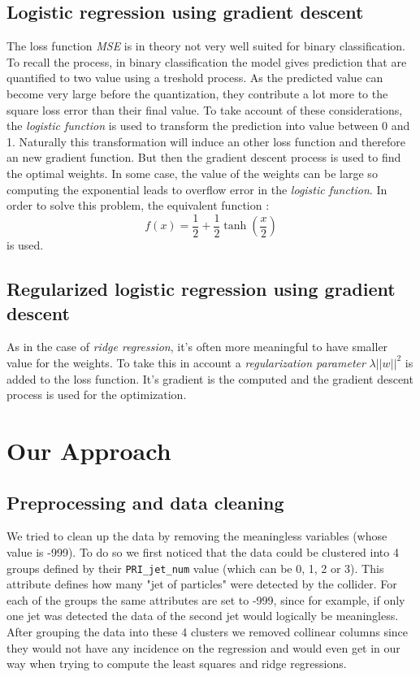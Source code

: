\documentclass[10pt,conference,compsocconf]{IEEEtran}
\begin{document}
\subsection{Logistic regression using gradient descent}
The loss function \textit{MSE} is in theory not very well suited for binary classification. To recall the process, in binary classification the model gives prediction that are quantified to two value using a treshold process. As the predicted value can become very large before the quantization, they contribute a lot more to the square loss error than their final value. To take account of these considerations, the \textit{logistic function} is used to transform the prediction into value between 0 and 1. Naturally this transformation will induce an other loss function and therefore an new gradient function. But then the gradient descent process is used to find the optimal weights. In some case, the value of the weights can be large so computing the exponential leads to overflow error in the \textit{logistic function}. In order to solve this problem, the equivalent function : 
\begin{equation}
f(x) = \frac{1}{2}+\frac{1}{2}\tanh \left(\frac{x}{2}\right)
\end{equation} 
is used.
\subsection{Regularized logistic regression using gradient descent}

As in the case of \textit{ridge regression}, it's often more meaningful to have smaller value for the weights. To take this in account a \textit{regularization parameter} $\lambda \vert\vert w \vert\vert ^2$ is added to the loss function. It's gradient is the computed and the gradient descent process is used for the optimization.


\section{Our Approach}

\subsection{Preprocessing and data cleaning}
We tried to clean up the data by removing the meaningless variables (whose value is -999). To do so we first noticed that the data could be clustered into 4 groups defined by their \texttt{PRI\_jet\_num} value (which can be 0, 1, 2 or 3). This attribute defines how many "jet of particles" were detected by the collider. For each of the groups the same attributes are set to -999, since for example, if only one jet was detected the data of the second jet would logically be meaningless. After grouping the data into these 4 clusters we removed collinear columns since they would not have any incidence on the regression and would even get in our way when trying to compute the least squares and ridge regressions.
\end{document}
